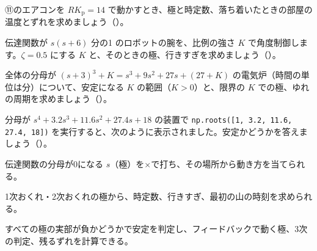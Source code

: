 
\bkproblem ⑪のエアコンを $RK_{\mathrm p}=14$ で動かすとき、極と時定数、落ち着いたときの部屋の温度とずれを求めましょう\mbox{（）}。

\bkproblem 伝達関数が $s(s+6)$ 分の1 のロボットの腕を、比例の強さ $K$ で角度制御します。$\zeta=0.5$ にする $K$ と、そのときの極、行きすぎを求めましょう\mbox{（）}。

\bkproblem 全体の分母が $(s+3)^3+K=s^3+9s^2+27s+(27+K)$ の電気炉（時間の単位は分）について、安定になる $K$ の範囲（$K>0$）と、限界の $K$ での極、ゆれの周期を求めましょう\mbox{（）}。

\bkproblem 分母が $s^4+3.2s^3+11.6s^2+27.4s+18$ の装置で \texttt{np.roots([1, 3.2, 11.6, 27.4, 18])} を実行すると、次のように表示されました。安定かどうかを答えましょう\mbox{（）}。
\begin{bkcodeout}[実行結果]
[-0.1+2.99833287j -0.1-2.99833287j
 -2. +0.j         -1. +0.j        ]
\end{bkcodeout}

\begin{furikaeri}
\begin{checklist}
\item 伝達関数の分母が0になる $s$（極）を×で打ち、その場所から動き方を当てられる。
\item 1次おくれ・2次おくれの極から、時定数、行きすぎ、最初の山の時刻を求められる。
\item すべての極の実部が負かどうかで安定を判定し、フィードバックで動く極、3次の判定、残るずれを計算できる。
\end{checklist}
\end{furikaeri}

